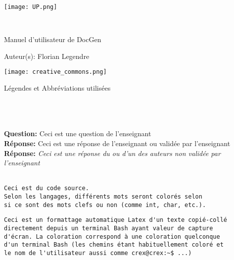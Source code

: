 \documentclass[a4paper, french]{report}
\begin{document}
\begin{titlepage}
    \begin{flushleft}
        \texttt{[image: UP.png]}\par
        \centering
        
        \vspace{13\baselineskip}       
        \HRule \\[0.4cm]

        {\Huge 
        Manuel d'utilisateur de DocGen\par}
        \vspace{0.4cm}
        \HRule
        \vfill
      
        Auteur(s): Florian Legendre\medskip \par
        
        \texttt{[image: creative\_commons.png]}\par
    \end{flushleft}
\end{titlepage}

\newpage
\begin{LARGE}
Légendes et Abbréviations utilisées\\\\\\\\
\end{LARGE}
\textbf{Question:} Ceci est une question de l'enseignant\\
\textbf{Réponse:} Ceci est une réponse de l'enseignant ou validée par l'enseignant\\
\textbf{Réponse:} \textit{Ceci est une réponse du ou d'un des auteurs non validée par l'enseignant}\\\\

\begin{lstlisting}[style=C, caption=Exemple de code source]
Ceci est du code source.
Selon les langages, différents mots seront colorés selon 
si ce sont des mots clefs ou non (comme int, char, etc.).
\end{lstlisting}

\begin{mdframed}[style=Bash]
\begin{lstlisting}[style=Bash, caption=Exemple d'une pseudo capture d'écran Bash]
Ceci est un formattage automatique Latex d'un texte copié-collé
directement depuis un terminal Bash ayant valeur de capture
d'écran. La coloration correspond à une coloration quelconque 
d'un terminal Bash (les chemins étant habituellement coloré et 
le nom de l'utilisateur aussi comme crex@crex:~$ ...)
\end{lstlisting}
\end{mdframed}
\end{document}
